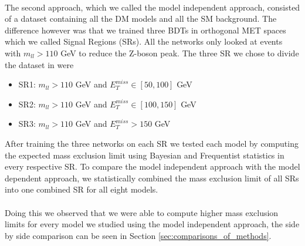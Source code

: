 \documentclass[12pt, a4paper]{book}
\begin{document}
\\The second approach, which we called the model independent approach, consisted of a dataset containing all the DM models and all the SM background. The difference however was that we trained three BDTs in orthogonal MET spaces which we called Signal Regions (SRs). All the networks only looked at events with $m_{ll}>110$ GeV to reduce the Z-boson peak. 
The three SR we chose to divide the dataset in were 
\begin{itemize}
   \item SR1: $m_{ll} >110$ GeV and $E_T^{miss} \in [50, 100]$ GeV
   \item SR2: $m_{ll} >110$ GeV and $E_T^{miss} \in [100, 150]$ GeV
   \item SR3: $m_{ll} >110$ GeV and $E_T^{miss} >150$ GeV
\end{itemize} 
After training the three networks on each SR we tested each model by computing the expected mass exclusion limit using Bayesian and Frequentist statistics in every respective SR. To compare the model independent approach with the model dependent approach, 
we statistically combined the mass exclusion limit of all SRs into one combined SR for all eight models. \\
\\Doing this we observed that we were able to compute higher mass exclusion limits for every model we studied using the model independent approach, the side by side comparison can be seen in Section \ref{sec:comparisons_of_methods}. 
\end{document}
